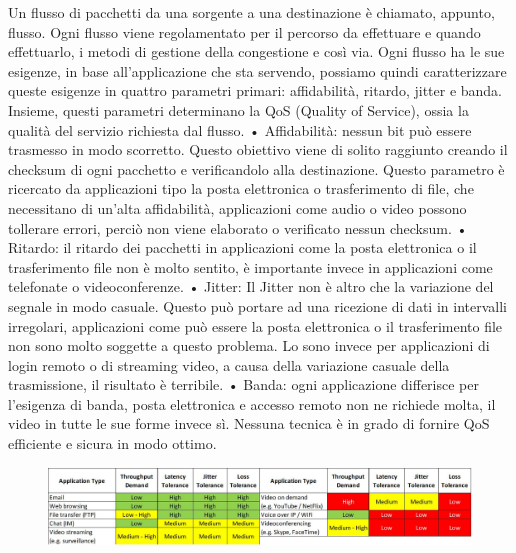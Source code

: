 Un flusso di pacchetti da una sorgente a una destinazione è chiamato, appunto, flusso.
Ogni flusso viene regolamentato per il percorso da effettuare e quando effettuarlo, i metodi di gestione della congestione e così via.
Ogni flusso ha le sue esigenze, in base all’applicazione che sta servendo, possiamo quindi caratterizzare queste esigenze in quattro parametri primari: affidabilità, ritardo, jitter e banda. Insieme, questi parametri determinano la QoS (Quality of Service), ossia la qualità del servizio richiesta dal flusso.
•	Affidabilità: nessun bit può essere trasmesso in modo scorretto. Questo obiettivo viene di solito raggiunto creando il checksum di ogni pacchetto e verificandolo alla destinazione. Questo parametro è ricercato da applicazioni tipo la posta elettronica o trasferimento di file, che necessitano di un’alta affidabilità, applicazioni come audio o video possono tollerare errori, perciò non viene elaborato o verificato nessun checksum.
•	Ritardo: il ritardo dei pacchetti in applicazioni come la posta elettronica o il trasferimento file non è molto sentito, è importante invece in applicazioni come telefonate o videoconferenze.
•	Jitter: Il Jitter non è altro che la variazione del segnale in modo casuale. Questo può portare ad una ricezione di dati in intervalli irregolari, applicazioni come può essere la posta elettronica o il trasferimento file non sono molto soggette a questo problema. Lo sono invece per applicazioni di login remoto o di streaming video, a causa della variazione casuale della trasmissione, il risultato è terribile.
•	Banda: ogni applicazione differisce per l’esigenza di banda, posta elettronica e accesso remoto non ne richiede molta, il video in tutte le sue forme invece sì.
Nessuna tecnica è in grado di fornire QoS efficiente e sicura in modo ottimo. 

\begin{figure}[H]
\centering
\includegraphics[scale=0.25]{res/img/40_QoS.png}
\end{figure}